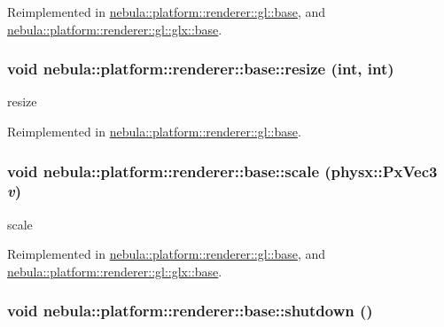 Reimplemented in \hyperlink{classnebula_1_1platform_1_1renderer_1_1gl_1_1base_add015b34e9567bfaca68a94c0cb76b06}{nebula::platform::renderer::gl::base}, and \hyperlink{classnebula_1_1platform_1_1renderer_1_1gl_1_1glx_1_1base_a2bf526a5a2f23318008cd1fa40a68d52}{nebula::platform::renderer::gl::glx::base}.\hypertarget{classnebula_1_1platform_1_1renderer_1_1base_ad41ade8ed9ea4995654e06287373646c}{
\subsubsection[{resize}]{\setlength{\rightskip}{0pt plus 5cm}void nebula::platform::renderer::base::resize (int, \/  int)}}
\label{classnebula_1_1platform_1_1renderer_1_1base_ad41ade8ed9ea4995654e06287373646c}
resize 

Reimplemented in \hyperlink{classnebula_1_1platform_1_1renderer_1_1gl_1_1base_a03a1e79ed69dc5d9e2a0835986dbe29c}{nebula::platform::renderer::gl::base}.\hypertarget{classnebula_1_1platform_1_1renderer_1_1base_a7d9aa890990667e9981af855a2c58cf7}{
\subsubsection[{scale}]{\setlength{\rightskip}{0pt plus 5cm}void nebula::platform::renderer::base::scale (physx::PxVec3 {\em v})}}
\label{classnebula_1_1platform_1_1renderer_1_1base_a7d9aa890990667e9981af855a2c58cf7}


scale 

Reimplemented in \hyperlink{classnebula_1_1platform_1_1renderer_1_1gl_1_1base_aa2cb1371b6b66b24b1d9bc8b8bbe1f90}{nebula::platform::renderer::gl::base}, and \hyperlink{classnebula_1_1platform_1_1renderer_1_1gl_1_1glx_1_1base_a2d51799c14c9f17a8e5eb0900a02714d}{nebula::platform::renderer::gl::glx::base}.\hypertarget{classnebula_1_1platform_1_1renderer_1_1base_a679ac8cd3db96e1bce5f2b5ef00f91e1}{
\subsubsection[{shutdown}]{\setlength{\rightskip}{0pt plus 5cm}void nebula::platform::renderer::base::shutdown ()}}
\label{classnebula_1_1platform_1_1renderer_1_1base_a679ac8cd3db96e1bce5f2b5ef00f91e1}


